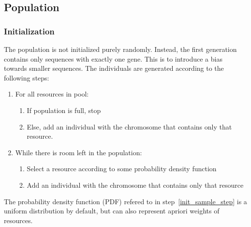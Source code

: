 \subsection{Population}
\subsubsection{Initialization}
\label{sec:approach_initialization}
The population is not initialized purely randomly. Instead, the first
generation contains only sequences with exactly one gene. This is to introduce
a bias towards smaller sequences. The individuals are generated according to
the following steps:
\begin{enumerate}
	\item For all resources in pool:
		\begin{enumerate}
			\item If population is full, stop
			\item Else, add an individual with the chromosome that contains
				only that resource.
		\end{enumerate}
	\item While there is room left in the population:
		\begin{enumerate}
			\item \label{init_sample_step}Select a resource according to some probability density function
			\item Add an individual with the chromosome that contains only that
				resource
		\end{enumerate}
\end{enumerate}
The probability density function (PDF) refered to in
step~\ref{init_sample_step} is a uniform distribution by default, but can also
represent apriori weights of resources.
